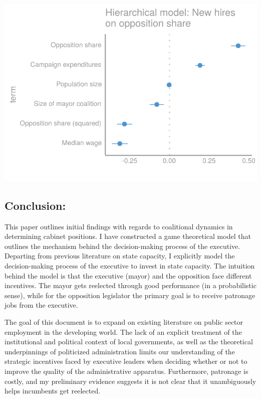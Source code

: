 \documentclass[12pt,]{article}
\begin{document}
\begin{center}\includegraphics{dissertation_files/figure-latex/unnamed-chunk-43-1} \end{center}

\hypertarget{conclusion}{%
\subsection{Conclusion:}\label{conclusion}}

This paper outlines initial findings with regards to coalitional
dynamics in determining cabinet positions. I have constructed a game
theoretical model that outlines the mechanism behind the decision-making
process of the executive. Departing from previous literature on state
capacity, I explicitly model the decision-making process of the
executive to invest in state capacity. The intuition behind the model is
that the executive (mayor) and the opposition face different incentives.
The mayor gets reelected through good performance (in a probabilistic
sense), while for the opposition legislator the primary goal is to
receive patronage jobs from the executive.

The goal of this document is to expand on existing literature on public
sector employment in the developing world. The lack of an explicit
treatment of the institutional and political context of local
governments, as well as the theoretical underpinnings of politicized
administration limits our understanding of the strategic incentives
faced by executive leaders when deciding whether or not to improve the
quality of the administrative apparatus. Furthermore, patronage is
costly, and my preliminary evidence suggests it is not clear that it
unambiguously helps incumbents get reelected.
\end{document}
